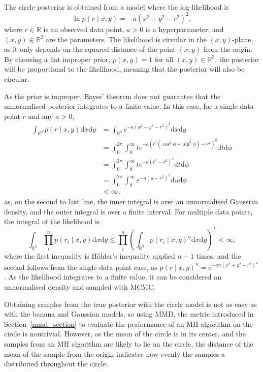 \documentclass[english,twoside,openright]{HYgraduMLDS}
\newcommand{\R}{\mathbb{R}}
\newcommand{\dx}{\mathrm{d}}
\begin{document}
The circle posterior is obtained from a model where the log-likelihood is
\[
    \ln p(r\mid x, y) = -a(x^2 + y^2 - r^2)^2,
\]
where \(r\in \R\) is an observed data point, \(a > 0\) is a hyperparameter,
and \((x, y)\in \R^{2}\) are the parameters.
The likelihood is circular in the \((x, y)\)-plane, as it only depends on the
squared distance of the point \((x, y)\) from the origin. By choosing a flat
improper prior, \(p(x, y) = 1\) for all \((x, y)\in \R^{2}\), the posterior will be
proportional to the likelihood, meaning that the posterior will also be circular.

As the prior is improper, Bayes' theorem does not guarantee that the
unnormalised posterior integrates to a finite
value. In this case, for a single data point \(r\) and any \(a > 0\),
\begin{align*}
  \int_{\R^{2}}p(r\mid x, y)\dx x\dx y
  &= \int_{\R^{2}}e^{-a(x^{2} + y^{2} - r^{2})^{2}}\dx x\dx y
  \\&= \int_{0}^{2\pi}\int_{0}^{\infty}
  te^{-a(t^{2}(\cos^{2} \phi + \sin^{2} \phi) - r^{2})^{2}} \dx t\dx \phi
  \\&= \int_{0}^{2\pi} \int_{0}^{\infty} te^{-a(t^{2} - r^{2})^{2}}\dx t\dx \phi
  \\&= \int_{0}^{2\pi} \int_{0}^{\infty} e^{-a(u - r^{2})^{2}}\dx u\dx \phi
  \\&< \infty,
\end{align*}
as, on the second to last line, the inner integral is over an unnormalised
Gaussian density, and
the outer integral is over a finite interval. For multiple data points, the
integral of the likelihood is
\[
  \int_{\R^{2}}\prod_{i}^{n}p(r_{i}\mid x,y)\dx x\dx y
  \leq \prod_{i}^{n}\left(\int_{\R^{2}}p(r_{i}\mid x,y)^{n}\dx x\dx y\right)^{\frac{1}{n}}
  < \infty,
\]
where the first inequality is Hölder's inequality applied \(n - 1\) times,
and the second follows from the single data point case, as
\(p(r\mid x,y)^{n} = e^{-an(x^{2} + y^{2} - r^{2})^{2}}\).
As the likelihood integrates to a
finite value, it can be considered an unnormalised density and sampled with MCMC.

Obtaining samples from the true posterior with the circle model is not
as easy as with the banana and Gaussian models, so using MMD, the metric
introduced in Section~\ref{mmd_section} to evaluate
the performance of an MH algorithm on the circle is nontrivial. However,
as the mean of the circle is in its center, and the samples from an MH
algorithm are likely to lie on the circle, the distance of the mean of the
sample from the origin indicates how evenly the samples a distributed throughout
the circle.
\end{document}
